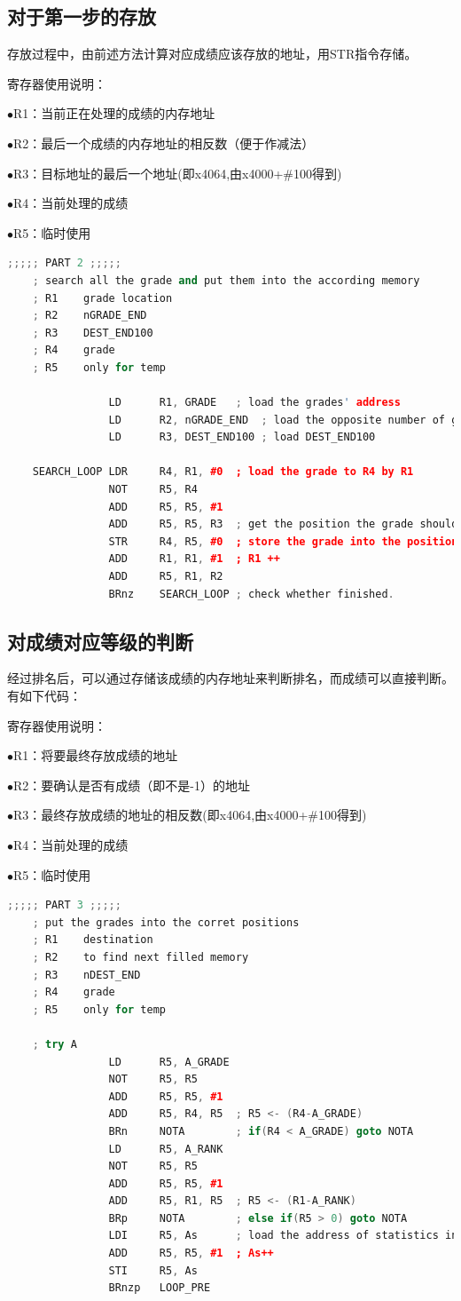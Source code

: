 \documentclass[UTF8]{article}
\begin{document}
	\subsection{对于第一步的存放}
	存放过程中，由前述方法计算对应成绩应该存放的地址，用STR指令存储。\par
	寄存器使用说明：\par
	$\bullet$R1：当前正在处理的成绩的内存地址\par
	$\bullet$R2：最后一个成绩的内存地址的相反数（便于作减法）\par
	$\bullet$R3：目标地址的最后一个地址(即x4064,由x4000+\#100得到)\par
	$\bullet$R4：当前处理的成绩\par
	$\bullet$R5：临时使用\par
	\begin{lstlisting}[language=C++]
	;;;;; PART 2 ;;;;;
	; search all the grade and put them into the according memory
	; R1	grade location
	; R2	nGRADE_END
	; R3	DEST_END100	
	; R4	grade
	; R5	only for temp
				
				LD		R1, GRADE	; load the grades' address
				LD		R2, nGRADE_END	; load the opposite number of grades' end address
				LD		R3, DEST_END100	; load DEST_END100
	
	SEARCH_LOOP	LDR		R4, R1, #0	; load the grade to R4 by R1	
				NOT		R5, R4
				ADD		R5, R5, #1
				ADD		R5, R5, R3	; get the position the grade should be
				STR		R4, R5, #0	; store the grade into the position
				ADD		R1, R1, #1	; R1 ++
				ADD		R5, R1, R2	
				BRnz	SEARCH_LOOP	; check whether finished.
	\end{lstlisting}
	\subsection{对成绩对应等级的判断}
	经过排名后，可以通过存储该成绩的内存地址来判断排名，而成绩可以直接判断。有如下代码：\par
	寄存器使用说明：\par
	$\bullet$R1：将要最终存放成绩的地址\par
	$\bullet$R2：要确认是否有成绩（即不是-1）的地址\par
	$\bullet$R3：最终存放成绩的地址的相反数(即x4064,由x4000+\#100得到)\par
	$\bullet$R4：当前处理的成绩\par
	$\bullet$R5：临时使用\par
	\begin{lstlisting}[language=C++]
	;;;;; PART 3 ;;;;;
	; put the grades into the corret positions
	; R1	destination
	; R2	to find next filled memory
	; R3	nDEST_END
	; R4	grade
	; R5	only for temp 
	
	; try A
				LD		R5, A_GRADE	
				NOT		R5, R5
				ADD		R5, R5, #1
				ADD		R5, R4, R5	; R5 <- (R4-A_GRADE) 
				BRn		NOTA		; if(R4 < A_GRADE) goto NOTA
				LD		R5, A_RANK
				NOT		R5, R5
				ADD		R5, R5, #1
				ADD		R5, R1, R5	; R5 <- (R1-A_RANK) 
				BRp		NOTA		; else if(R5 > 0) goto NOTA
				LDI		R5, As		; load the address of statistics information.
				ADD		R5, R5, #1	; As++
				STI		R5, As
				BRnzp	LOOP_PRE
	\end{lstlisting}
	
\end{document}
